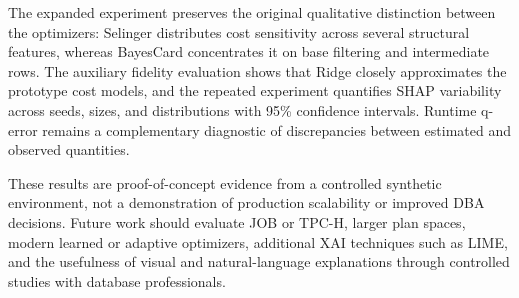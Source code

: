\documentclass[conference]{IEEEtran}
\begin{document}
The expanded experiment preserves the original qualitative distinction between the optimizers: Selinger distributes cost sensitivity across several structural features, whereas BayesCard concentrates it on base filtering and intermediate rows. The auxiliary fidelity evaluation shows that Ridge closely approximates the prototype cost models, and the repeated experiment quantifies SHAP variability across seeds, sizes, and distributions with 95\% confidence intervals. Runtime q-error remains a complementary diagnostic of discrepancies between estimated and observed quantities.

These results are proof-of-concept evidence from a controlled synthetic environment, not a demonstration of production scalability or improved DBA decisions. Future work should evaluate JOB or TPC-H, larger plan spaces, modern learned or adaptive optimizers, additional XAI techniques such as LIME, and the usefulness of visual and natural-language explanations through controlled studies with database professionals.
\end{document}

